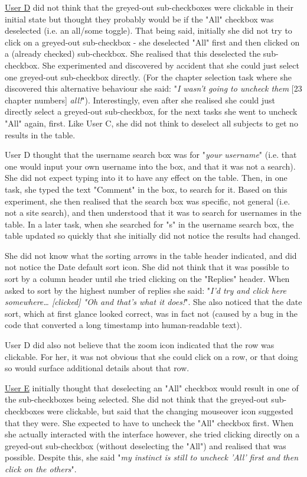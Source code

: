 \underline{User D} did not think that the greyed-out sub-checkboxes were clickable in their initial state but thought they probably would be if the "All" checkbox was deselected (i.e. an all/some toggle). That being said, initially she did not try to click on a greyed-out sub-checkbox - she deselected "All" first and then clicked on a (already checked) sub-checkbox. She realised that this deselected the sub-checkbox. She experimented and discovered by accident that she could just select one greyed-out sub-checkbox directly. (For the chapter selection task where she discovered this alternative behaviour she said: "\textit{I wasn't going to uncheck them} [23 chapter numbers] \textit{all!}"). Interestingly, even after she realised she could just directly select a greyed-out sub-checkbox, for the next tasks she went to uncheck "All" again, first. Like User C, she did not think to deselect all subjects to get no results in the table. 

User D thought that the username search box was for "\textit{your username}" (i.e. that one would input your own username into the box, and that it was not a search). She did not expect typing into it to have any effect on the table. Then, in one task, she typed the text "Comment" in the box, to search for it. Based on this experiment, she then realised that the search box was specific, not general (i.e. not a site search), and then understood that it was to search for usernames in the table. In a later task, when she searched for "s" in the username search box, the table updated so quickly that she initially did not notice the results had changed.

She did not know what the sorting arrows in the table header indicated, and did not notice the Date default sort icon. She did not think that it was possible to sort by a column header until she tried clicking on the "Replies" header. When asked to sort by the highest number of replies she said: "\textit{I'd try and click here somewhere… [clicked] "Oh and that's what it does!}". She also noticed that the date sort, which at first glance looked correct, was in fact not (caused by a bug in the code that converted a long timestamp into human-readable text). 

User D did also not believe that the zoom icon indicated that the row was clickable. For her, it was not obvious that she could click on a row, or that doing so would surface additional details about that row. 

\underline{User E} initially thought that deselecting an "All" checkbox would result in one of the sub-checkboxes being selected. She did not think that the greyed-out sub-checkboxes were clickable, but said that the changing mouseover icon suggested that they were. She expected to have to uncheck the "All" checkbox first. When she actually interacted with the interface however, she tried clicking directly on a greyed-out sub-checkbox (without deselecting the "All") and realised that was possible. Despite this, she said "\textit{my instinct is still to uncheck 'All' first and then click on the others}".

